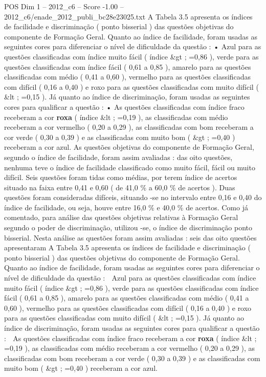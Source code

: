 \begin{textsample}{POS Dim 1 – 2012\_c6 – Score -1.00 – 2012\_c6/enade\_2012\_publi\_bc28e23025.txt}
A Tabela 3.5 apresenta os índices de facilidade e discriminação ( ponto bisserial ) das questões objetivas do componente de Formação Geral.
Quanto ao índice de facilidade, foram usadas as seguintes cores para diferenciar o nível de dificuldade da questão : • Azul para as questões classificadas com índice muito fácil ( índice \&gt ; =0,86 ), verde para as questões classificadas com índice fácil ( 0,61 a 0,85 ), amarelo para as questões classificadas com médio ( 0,41 a 0,60 ), vermelho para as questões classificadas com difícil ( 0,16 a 0,40 ) e roxo para as questões classificadas com muito difícil ( \&lt ; =0,15 ).
Já quanto ao índice de discriminação, foram usadas as seguintes cores para qualificar a questão : • As questões classificadas com índice fraco receberam a cor \textbf{roxa} ( índice \&lt ; =0,19 ), as classificadas com médio receberam a cor vermelho ( 0,20 a 0,29 ), as classificadas com bom receberam a cor verde ( 0,30 a 0,39 ) e as classificadas com muito bom ( \&gt ; =0,40 ) receberam a cor azul.
As questões objetivas do componente de Formação Geral, segundo o índice de facilidade, foram assim avaliadas : das oito questões, nenhuma teve o índice de facilidade classificado como muito fácil, fácil ou muito difícil.
Seis questões foram tidas como médias, por terem índice de acertos situado na faixa entre 0,41 e 0,60 ( de 41,0 \% a 60,0 \% de acertos ).
Duas questões foram consideradas difíceis, situando -se no intervalo entre 0,16 e 0,40 do índice de facilidade, ou seja, houve entre 16,0 \% e 40,0 \% de acertos.
Como já comentado, para análise das questões objetivas relativas à Formação Geral segundo o poder de discriminação, utilizou -se, o índice de discriminação ponto bisserial.
Nesta análise as questões foram assim avaliadas : seis das oito questões apresentaram A Tabela 3.5 apresenta os índices de facilidade e discriminação ( ponto bisserial ) das questões objetivas do componente de Formação Geral.
Quanto ao índice de facilidade, foram usadas as seguintes cores para diferenciar o nível de dificuldade da questão :  Azul para as questões classificadas com índice muito fácil ( índice \&gt ; =0,86 ), verde para as questões classificadas com índice fácil ( 0,61 a 0,85 ), amarelo para as questões classificadas com médio ( 0,41 a 0,60 ), vermelho para as questões classificadas com difícil ( 0,16 a 0,40 ) e roxo para as questões classificadas com muito difícil ( \&lt ; =0,15 ).
Já quanto ao índice de discriminação, foram usadas as seguintes cores para qualificar a questão :  As questões classificadas com índice fraco receberam a cor \textbf{roxa} ( índice \&lt ; =0,19 ), as classificadas com médio receberam a cor vermelho ( 0,20 a 0,29 ), as classificadas com bom receberam a cor verde ( 0,30 a 0,39 ) e as classificadas com muito bom ( \&gt ; =0,40 ) receberam a cor azul.

\end{textsample}
